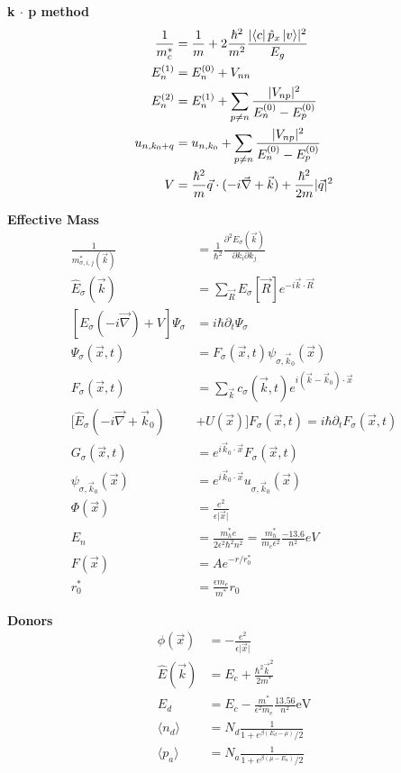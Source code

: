 \documentclass[12pt]{article}
\begin{document}
\begin{multicols}{2}
\noindent
\textbf{k $\cdot$ p method}
\begin{align}
  \frac{1}{m_c^{*}} &= \frac{1}{m} + 2 \frac{\hbar^2}{m^2}\frac{\lvert\bra{c} \hat{p}_x \ket{v}\rvert^2}{E_g}\\
  E_n^{(1)} &= E_n^{(0)} + V_{nn}\\
  E_n^{(2)} &= E_n^{(1)} + \sum_{p \neq n}\frac{\lvert V_{np} \rvert^2}{E_n^{(0)} - E_p^{(0)}}\\
  u_{n,k_0+q} &= u_{n,k_0} + \sum_{p \neq n}\frac{\lvert V_{np} \rvert^2}{E_n^{(0)} - E_p^{(0)}}\\
  V &= \frac{\hbar^2}{m}\vec{q} \cdot (-i \vec{\nabla} + \vec{k}) + \frac{\hbar^2}{2m}\lvert\vec{q}\rvert^2
\end{align}

\noindent
\textbf{Effective Mass}
\begin{align}
  \frac{1}{m_{\sigma, i, j}^{*}(\vec{k})} &= \frac{1}{\hbar^2} \frac{\partial^2 E_{\sigma}(\vec{k})}{\partial k_i \partial k_j}\\
  \hat{E}_{\sigma}(\vec{k}) &= \sum_{\vec{R}} E_{\sigma}[\vec{R}] e^{-i \vec{k} \cdot \vec{R}}\\
  [E_{\sigma}(-i\vec{\nabla}) + V]\Psi_{\sigma} &= i\hbar\partial_t \Psi_{\sigma}\\
    \Psi_{\sigma}(\vec{x}, t) &= F_{\sigma}(\vec{x}, t) \psi_{\sigma, \vec{k}_0}(\vec{x})\\ %
  F_{\sigma}(\vec{x}, t) &= \sum_{\vec{k}}c_{\sigma}(\vec{k}, t)e^{i(\vec{k} - \vec{k}_0) \cdot \vec{x}}\\
  [\hat{E}_{\sigma}(-i\vec{\nabla} + \vec{k}_0) &+ U(\vec{x})]F_{\sigma}(\vec{x}, t) = i\hbar \partial_t F_{\sigma}(\vec{x}, t)\\
  G_{\sigma}(\vec{x}, t) &= e^{i\vec{k}_0 \cdot \vec{x}}F_{\sigma}(\vec{x}, t)\\
  \psi_{\sigma,\vec{k}_0}(\vec{x}) &= e^{i\vec{k}_0 \cdot \vec{x}}u_{\sigma, \vec{k}_0}(\vec{x})\\
  \Phi(\vec{x}) &= \frac{e^2}{\epsilon \lvert \vec{x} \rvert}\\
  E_n &= \frac{m^{*}_{h}e}{2\epsilon^2\hbar^2n^2} = \frac{m_h^{*}}{m_e\epsilon^2}\frac{-13.6}{n^2}eV\\
  F(\vec{x}) &= Ae^{-r/r_0^*}\\
  r_0^* &= \frac{\epsilon m_e}{m^{*}}r_0
\end{align}

\noindent
\textbf{Donors}
\begin{align}
    \phi(\vec{x}) &= -\frac{e^2}{\epsilon \lvert \vec{x} \rvert}\\
    \hat{E}(\vec{k}) &= E_c + \frac{\hbar^2 \vec{k}^2}{2m^{*}}\\
    E_d &= E_c - \frac{m^{*}}{\epsilon^{2}m_e} \frac{13.56}{n^2} \textrm{eV}\\
    \langle n_d \rangle &= N_d\frac{1}{1 + e^{\beta(E_d - \mu)}/2}\\
    \langle p_a \rangle &= N_a\frac{1}{1 + e^{\beta(\mu - E_a)}/2}
\end{align}


\end{multicols}
\end{document}
